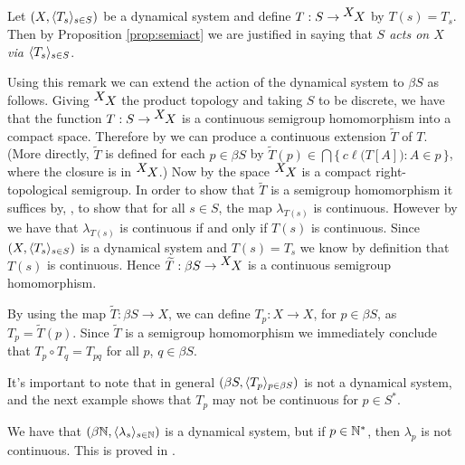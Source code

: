   \begin{rmk}
    Let $(X, \langle T_s \rangle_{s \in S})$ be a dynamical system and define $T : S \to
    \hbox{${}^{\hbox{$X$}}\hskip -1 pt X$}$ by $T(s) = T_s$.
    Then by Proposition \ref{prop:semiact} we are justified in saying
    that \textsl{$S$ acts on $X$ via $\langle T_s \rangle_{s \in S}$}.
  \end{rmk}

Using this remark we can extend the action of the dynamical system to
$\beta S$ as follows.
Giving $\hbox{${}^{\hbox{$X$}}\hskip -1 pt X$}$ the product topology and taking $S$ to be 
discrete, we have that the function $T :
S \to \hbox{${}^{\hbox{$X$}}\hskip -1 pt X$}$ is a continuous semigroup
homomorphism into a compact space.
Therefore by \cite[Theorem 3.27]{Hindman:1998fk} we can produce a
continuous extension $\widetilde{T}$ of $T$.
(More directly, $\widetilde{T}$ is defined for each $p \in \beta S$ by
$\widetilde{T}(p) \in \bigcap \{\, c\ell\bigl( T[A] \bigr) : A \in p \,\}$, where
the closure is in $\hbox{${}^{\hbox{$X$}}\hskip -1 pt X$}$.)
Now by \cite[Theorem 2.22(a)]{Hindman:1998fk} the space $\hbox{${}^{\hbox{$X$}}\hskip -1 pt X$}$ is
a compact right-topological semigroup.
In order to show that $\widetilde{T}$ is a semigroup homomorphism it
suffices by, \cite[Corollary 4.22]{Hindman:1998fk}, to show that for all
$s \in S$, the
map $\lambda_{T(s)}$ is continuous.
However by \cite[Theorem 2.2(b)]{Hindman:1998fk} we have that
$\lambda_{T(s)}$ is continuous if and only if $T(s)$ is continuous. 
Since $(X, \langle T_s \rangle_{s \in S})$ is a dynamical system and $T(s) = T_s$ we know by
definition that $T(s)$ is continuous. 
Hence $\widetilde{T} : \beta S \to \hbox{${}^{\hbox{$X$}}\hskip -1 pt X$}$ is a continuous semigroup
homomorphism.

  \begin{rmk}
    By using the map $\widetilde{T} : \beta S \to X$, we can define
    $T_p : X \to X$, for $p \in \beta S$, as $T_p =
    \widetilde{T}(p)$. 
    Since $\widetilde{T}$ is a semigroup homomorphism we immediately
    conclude that $T_p \circ T_q = T_{pq}$ for all $p$, $q \in \beta
    S$.
   \end{rmk}

It's important to note that in general $(\beta S, \langle T_p \rangle_{p
  \in \beta S})$ is not a dynamical system, and 
the next example shows that $T_p$ may not be continuous for $p \in S^*$.
 

  \begin{example}
    We have that $(\beta\mathbb{N}, \langle \lambda_s \rangle_{s\in\mathbb{N}})$ is a
    dynamical system, but if $p \in \mathbb{N}^*$, then $\lambda_p$ is not
    continuous.
    This is proved in \cite[Theorem 6.10 and Remark 6.11]{Hindman:1998fk}.
   \end{example}


